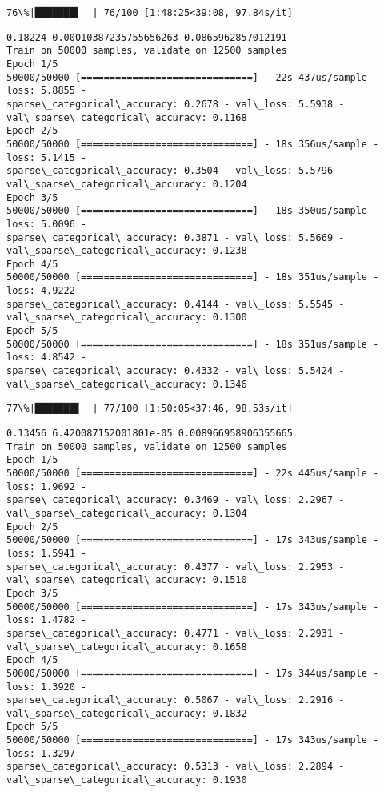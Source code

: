 \documentclass[11pt]{article}
\begin{document}
    \begin{Verbatim}[commandchars=\\\{\}]
 76\%|███████▌  | 76/100 [1:48:25<39:08, 97.84s/it]
    \end{Verbatim}

    \begin{Verbatim}[commandchars=\\\{\}]
0.18224 0.00010387235755656263 0.0865962857012191
Train on 50000 samples, validate on 12500 samples
Epoch 1/5
50000/50000 [==============================] - 22s 437us/sample - loss: 5.8855 -
sparse\_categorical\_accuracy: 0.2678 - val\_loss: 5.5938 -
val\_sparse\_categorical\_accuracy: 0.1168
Epoch 2/5
50000/50000 [==============================] - 18s 356us/sample - loss: 5.1415 -
sparse\_categorical\_accuracy: 0.3504 - val\_loss: 5.5796 -
val\_sparse\_categorical\_accuracy: 0.1204
Epoch 3/5
50000/50000 [==============================] - 18s 350us/sample - loss: 5.0096 -
sparse\_categorical\_accuracy: 0.3871 - val\_loss: 5.5669 -
val\_sparse\_categorical\_accuracy: 0.1238
Epoch 4/5
50000/50000 [==============================] - 18s 351us/sample - loss: 4.9222 -
sparse\_categorical\_accuracy: 0.4144 - val\_loss: 5.5545 -
val\_sparse\_categorical\_accuracy: 0.1300
Epoch 5/5
50000/50000 [==============================] - 18s 351us/sample - loss: 4.8542 -
sparse\_categorical\_accuracy: 0.4332 - val\_loss: 5.5424 -
val\_sparse\_categorical\_accuracy: 0.1346
    \end{Verbatim}

    \begin{Verbatim}[commandchars=\\\{\}]
 77\%|███████▋  | 77/100 [1:50:05<37:46, 98.53s/it]
    \end{Verbatim}

    \begin{Verbatim}[commandchars=\\\{\}]
0.13456 6.420087152001801e-05 0.008966958906355665
Train on 50000 samples, validate on 12500 samples
Epoch 1/5
50000/50000 [==============================] - 22s 445us/sample - loss: 1.9692 -
sparse\_categorical\_accuracy: 0.3469 - val\_loss: 2.2967 -
val\_sparse\_categorical\_accuracy: 0.1304
Epoch 2/5
50000/50000 [==============================] - 17s 343us/sample - loss: 1.5941 -
sparse\_categorical\_accuracy: 0.4377 - val\_loss: 2.2953 -
val\_sparse\_categorical\_accuracy: 0.1510
Epoch 3/5
50000/50000 [==============================] - 17s 343us/sample - loss: 1.4782 -
sparse\_categorical\_accuracy: 0.4771 - val\_loss: 2.2931 -
val\_sparse\_categorical\_accuracy: 0.1658
Epoch 4/5
50000/50000 [==============================] - 17s 344us/sample - loss: 1.3920 -
sparse\_categorical\_accuracy: 0.5067 - val\_loss: 2.2916 -
val\_sparse\_categorical\_accuracy: 0.1832
Epoch 5/5
50000/50000 [==============================] - 17s 343us/sample - loss: 1.3297 -
sparse\_categorical\_accuracy: 0.5313 - val\_loss: 2.2894 -
val\_sparse\_categorical\_accuracy: 0.1930
    \end{Verbatim}
\end{document}
